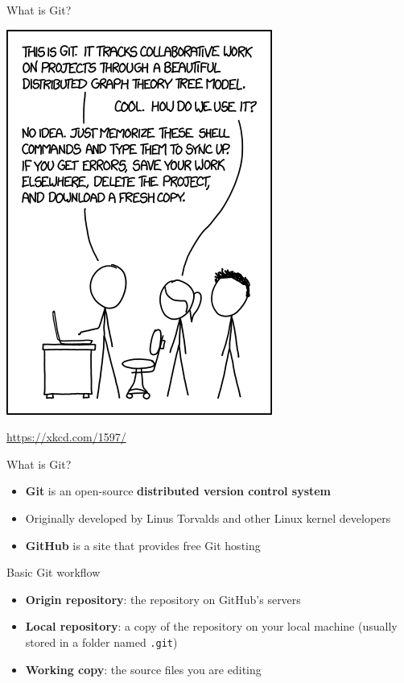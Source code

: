 \begin{frame}{What is Git?}
    \begin{center}
        \includegraphics[height=0.7\textheight]{xkcd1597}
        
        {\tiny\url{https://xkcd.com/1597/}}
    \end{center}
\end{frame}

\begin{frame}{What is Git?}
    \begin{itemize}
        \item \textbf{Git} is an open-source \textbf{distributed version control system}
        \item Originally developed by Linus Torvalds and other Linux kernel developers
        \item \textbf{GitHub} is a site that provides free Git hosting
    \end{itemize}
\end{frame}

\begin{frame}{Basic Git workflow}
    \begin{itemize}
        \item \textbf{Origin repository}: the repository on GitHub's servers
        \item \textbf{Local repository}: a copy of the repository on your local machine
            (usually stored in a folder named \texttt{.git})
        \item \textbf{Working copy}: the source files you are editing
    \end{itemize}
\end{frame}

